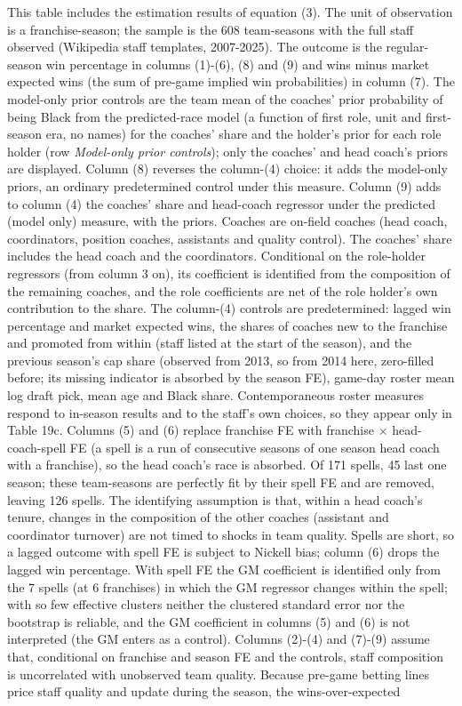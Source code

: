 \begin{table}[!h]
{\begin{threeparttable}
\begin{tablenotes}[para]
\item This table includes the estimation results of equation (3). The unit of observation is a franchise-season; the sample is the 608 team-seasons with the full staff observed (Wikipedia staff templates, 2007-2025). The outcome is the regular-season win percentage in columns (1)-(6), (8) and (9) and wins minus market expected wins (the sum of pre-game implied win probabilities) in column (7). The model-only prior controls are the team mean of the coaches' prior probability of being Black from the predicted-race model (a function of first role, unit and first-season era, no names) for the coaches' share and the holder's prior for each role holder (row \textit{Model-only prior controls}); only the coaches' and head coach's priors are displayed. Column (8) reverses the column-(4) choice: it adds the model-only priors, an ordinary predetermined control under this measure. Column (9) adds to column (4) the coaches' share and head-coach regressor under the predicted (model only) measure, with the priors. Coaches are on-field coaches (head coach, coordinators, position coaches, assistants and quality control). The coaches' share includes the head coach and the coordinators. Conditional on the role-holder regressors (from column 3 on), its coefficient is identified from the composition of the remaining coaches, and the role coefficients are net of the role holder's own contribution to the share. The column-(4) controls are predetermined: lagged win percentage and market expected wins, the shares of coaches new to the franchise and promoted from within (staff listed at the start of the season), and the previous season's cap share (observed from 2013, so from 2014 here, zero-filled before; its missing indicator is absorbed by the season FE), game-day roster mean log draft pick, mean age and Black share. Contemporaneous roster measures respond to in-season results and to the staff's own choices, so they appear only in Table 19c. Columns (5) and (6) replace franchise FE with franchise $\times$ head-coach-spell FE (a spell is a run of consecutive seasons of one season head coach with a franchise), so the head coach's race is absorbed. Of 171 spells, 45 last one season; these team-seasons are perfectly fit by their spell FE and are removed, leaving 126 spells. The identifying assumption is that, within a head coach's tenure, changes in the composition of the other coaches (assistant and coordinator turnover) are not timed to shocks in team quality. Spells are short, so a lagged outcome with spell FE is subject to Nickell bias; column (6) drops the lagged win percentage. With spell FE the GM coefficient is identified only from the 7 spells (at 6 franchises) in which the GM regressor changes within the spell; with so few effective clusters neither the clustered standard error nor the bootstrap is reliable, and the GM coefficient in columns (5) and (6) is not interpreted (the GM enters as a control). Columns (2)-(4) and (7)-(9) assume that, conditional on franchise and season FE and the controls, staff composition is uncorrelated with unobserved team quality. Because pre-game betting lines price staff quality and update during the season, the wins-over-expected 
\end{tablenotes}
\end{threeparttable}}
\end{table}
